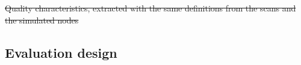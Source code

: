 \documentclass[pdflatex,sn-basic,lineno]{sn-jnl} %
\newcommand{\tabsize}{\fontsize{8}{9.5}\selectfont}
\providecommand{\DIFdel}[1]{{\protect\color{red}\sout{#1}}}                      %
\providecommand{\DIFdelbegin}{} %
\providecommand{\DIFdelend}{} %
\providecommand{\DIFdelFL}[1]{\DIFdel{#1}} %
\newcommand{\DIFscaledelfig}{0.5}
\newlength{\DIFdelgraphicswidth} %
\newlength{\DIFdelgraphicsheight} %
\newcommand{\DIFdelincludegraphics}[2][]{%
\sbox{\DIFdelgraphicsbox}{\DIFOincludegraphics[#1]{#2}}%
\settoboxwidth{\DIFdelgraphicswidth}{\DIFdelgraphicsbox} %
\settoboxtotalheight{\DIFdelgraphicsheight}{\DIFdelgraphicsbox} %
\scalebox{\DIFscaledelfig}{%
\parbox[b]{\DIFdelgraphicswidth}{\usebox{\DIFdelgraphicsbox}\\[-\baselineskip] \rule{\DIFdelgraphicswidth}{0em}}\llap{\resizebox{\DIFdelgraphicswidth}{\DIFdelgraphicsheight}{%
\setlength{\unitlength}{\DIFdelgraphicswidth}%
\begin{picture}(1,1)%
\thicklines\linethickness{2pt} %
{\color[rgb]{1,0,0}\put(0,0){\framebox(1,1){}}}%
{\color[rgb]{1,0,0}\put(0,0){\line( 1,1){1}}}%
{\color[rgb]{1,0,0}\put(0,1){\line(1,-1){1}}}%
\end{picture}%
}\hspace*{3pt}}} %
} %
\DeclareRobustCommand{\DIFdelbegin}{\DIFOdelbegin \let\includegraphics\DIFdelincludegraphics} %
\DeclareRobustCommand{\DIFdelend}{\DIFOaddend \let\includegraphics\DIFOincludegraphics} %
\begin{document}
\DIFdelbegin %
{%
\DIFdelFL{Quality characteristics, extracted with the same definitions from the scans and the simulated nodes}}%

\DIFdelend \subsection{Evaluation design}\label{sec:evaldesign}
\end{document}
